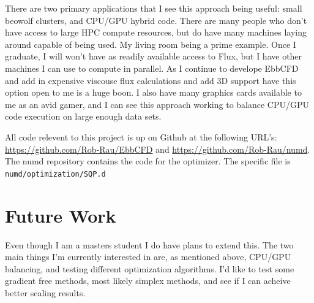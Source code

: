 \documentclass[12pt,parskip=full]{article}
\numberwithin{subsection}{section}
\begin{document}
		There are two primary applications that I see this approach being useful: small beowolf clusters, and CPU/GPU hybrid code. There are many people
		who don't have access to large HPC compute resources, but do have many machines laying around capable of being used. My living room being a prime
		example. Once I graduate, I will won't have as readily available access to Flux, but I have other machines I can use to compute in parallel. As I
		continue to develope EbbCFD and add in expensive viscouse flux calculations and add 3D support have this option open to me is a huge boon. I also
		have many graphics cards available to me as an avid gamer, and I can see this approach working to balance CPU/GPU code execution on large enough
		data sets.

		All code relevent to this project is up on Github at the following URL's: \url{https://github.com/Rob-Rau/EbbCFD} and \url{https://github.com/Rob-Rau/numd}.
		The numd repository contains the code for the optimizer. The specific file is \verb|numd/optimization/SQP.d|
	\section{Future Work}
		Even though I am a masters student I do have plans to extend this. The two main things I'm currently interested in are, as mentioned above, CPU/GPU
		balancing, and testing different optimization algorithms. I'd like to test some gradient free methods, most likely simplex methods, and see if I
		can acheive better scaling results. 
\end{document}

